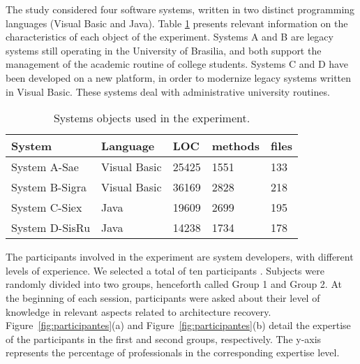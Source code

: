 The study considered four software systems, written in two distinct programming languages (Visual Basic and Java). Table \ref{tabelaSistemasObjetos}  presents relevant information on the characteristics of each object of the experiment. Systems A 
and B are legacy systems still operating in the University of Brasilia, and both support the management of the academic routine of college students. Systems C and D have been developed on a new platform, in order to modernize legacy systems written in Visual Basic. These systems deal with administrative university routines.

\begin{table}[h]
	\centering
	\caption{Systems objects used in the experiment.}
	\label{tabelaSistemasObjetos}
	\begin{tabular}{|lllll|}
		\hline
		System  & Language    & LOC   &  methods & files  \\ \hline
		System A-Sae             & Visual Basic & 25425 & 1551       & 133        \\
		System B-Sigra           & Visual Basic & 36169 & 2828       & 218        \\
		System C-Siex            & Java         & 19609 & 2699       & 195        \\
		System D-SisRu           & Java         & 14238 & 1734       & 178        \\ \hline
	\end{tabular}
\end{table}


The participants involved in the experiment are system developers, with different levels of experience. We selected a total of ten participants . Subjects were randomly divided into two groups, henceforth called Group 1 and Group 2. At the beginning of each session, participants were asked about their level of knowledge in relevant aspects related to architecture recovery. Figure~\ref{fig:participantes}(a) and Figure~\ref{fig:participantes}(b) detail the expertise of the participants in the first and second groups, respectively. The y-axis represents the percentage of professionals in the corresponding expertise level.

